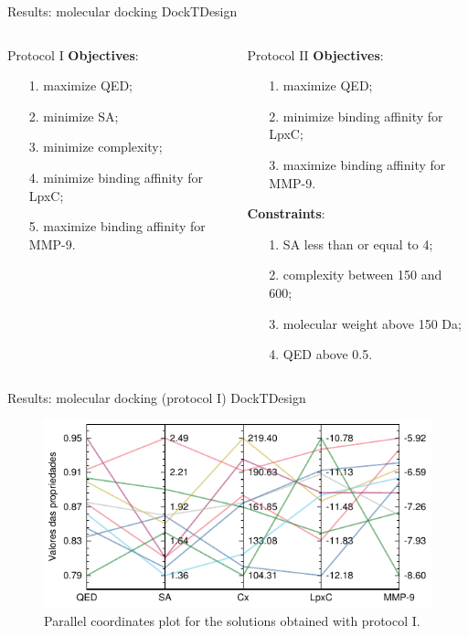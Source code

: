 \documentclass[aspectratio=169,xcolor=dvipsnames]{beamer}
\begin{document}
\begin{frame}{Results: molecular docking \hfill {\footnotesize \alert{DockTDesign}}}
    \begin{columns}[c]
        \begin{block}{Protocol I}
            \textbf{Objectives}:
            \begin{itemize}
                \item[1.] maximize QED;
                \item[2.] minimize SA;
                \item[3.] minimize complexity;
                \item[4.] minimize binding affinity for LpxC;
                \item[5.] maximize binding affinity for MMP-9.
            \end{itemize}
        \end{block}

        \begin{block}{Protocol II}
            \textbf{Objectives}:
            \begin{itemize}
                \item[1.] maximize QED;
                \item[2.] minimize binding affinity for LpxC;
                \item[3.] maximize binding affinity for MMP-9.
            \end{itemize}
            \textbf{Constraints}:
            \begin{itemize}
                \item[1.] SA less than or equal to 4;
                \item[2.] complexity between 150 and 600;
                \item[3.] molecular weight above 150 Da;
                \item[4.] QED above 0.5.
            \end{itemize}
        \end{block}
    \end{columns}
\end{frame}


\begin{frame}{Results: molecular docking (protocol I) \hfill {\footnotesize \alert{DockTDesign}}}
    \begin{figure}
        \centering
        \includegraphics[width=.8\textwidth]{imgs/results/protocol1-parallel-coords}
        \caption{Parallel coordinates plot for the solutions obtained with protocol I.}
    \end{figure}
\end{frame}
\end{document}
